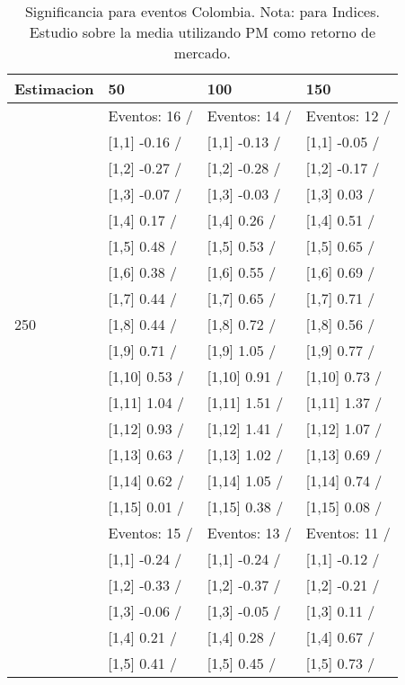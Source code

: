 \begin{table}

\caption{Significancia para eventos Colombia. Nota: para Indices. Estudio sobre la media utilizando PM como retorno de mercado.}
\centering
\begin{tabular}[t]{llll}
\toprule
Estimacion & 50 & 100 & 150\\
\midrule
 & Eventos:  16 / & Eventos:  14 / & Eventos:  12 /\\
 & {}[1,1] -0.16  / & {}[1,1] -0.13  / & {}[1,1] -0.05  /\\
 & {}[1,2] -0.27  / & {}[1,2] -0.28  / & {}[1,2] -0.17  /\\
 & {}[1,3] -0.07  / & {}[1,3] -0.03  / & {}[1,3] 0.03  /\\
 & {}[1,4] 0.17  / & {}[1,4] 0.26  / & {}[1,4] 0.51  /\\
\addlinespace
 & {}[1,5] 0.48  / & {}[1,5] 0.53  / & {}[1,5] 0.65  /\\
 & {}[1,6] 0.38  / & {}[1,6] 0.55  / & {}[1,6] 0.69  /\\
 & {}[1,7] 0.44  / & {}[1,7] 0.65  / & {}[1,7] 0.71  /\\
250 & {}[1,8] 0.44  / & {}[1,8] 0.72  / & {}[1,8] 0.56  /\\
 & {}[1,9] 0.71  / & {}[1,9] 1.05  / & {}[1,9] 0.77  /\\
\addlinespace
 & {}[1,10] 0.53  / & {}[1,10] 0.91  / & {}[1,10] 0.73  /\\
 & {}[1,11] 1.04  / & {}[1,11] 1.51  / & {}[1,11] 1.37  /\\
 & {}[1,12] 0.93  / & {}[1,12] 1.41  / & {}[1,12] 1.07  /\\
 & {}[1,13] 0.63  / & {}[1,13] 1.02  / & {}[1,13] 0.69  /\\
 & {}[1,14] 0.62  / & {}[1,14] 1.05  / & {}[1,14] 0.74  /\\
\addlinespace
 & {}[1,15] 0.01  / & {}[1,15] 0.38  / & {}[1,15] 0.08  /\\
 & Eventos:  15 / & Eventos:  13 / & Eventos:  11 /\\
 & {}[1,1] -0.24  / & {}[1,1] -0.24  / & {}[1,1] -0.12  /\\
 & {}[1,2] -0.33  / & {}[1,2] -0.37  / & {}[1,2] -0.21  /\\
 & {}[1,3] -0.06  / & {}[1,3] -0.05  / & {}[1,3] 0.11  /\\
\addlinespace
 & {}[1,4] 0.21  / & {}[1,4] 0.28  / & {}[1,4] 0.67  /\\
 & {}[1,5] 0.41  / & {}[1,5] 0.45  / & {}[1,5] 0.73  /\\

\end{tabular}
\end{table}

